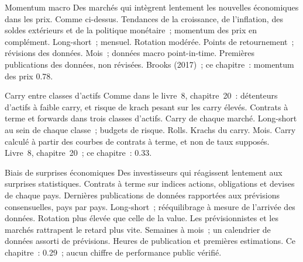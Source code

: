 \begin{strategyfile}{Momentum macro}\label{strat:s2:systematic-macro:momentum}
 Des marchés qui intègrent lentement les nouvelles économiques dans les prix.
 Comme ci-dessus.
 Tendances de la croissance, de l'inflation, des soldes extérieurs et de la politique monétaire~; momentum des prix en complément.
 Long-short~; mensuel.
 Rotation modérée.
 Points de retournement~; révisions des données.
 Mois~; données macro point-in-time.
 Premières publications des données, non révisées.
 Brooks (2017)~; ce chapitre~: momentum des prix 0.78.
\end{strategyfile}

\begin{strategyfile}{Carry entre classes d'actifs}\label{strat:s2:systematic-macro:carry}
 Comme dans le livre~8, chapitre~20~: détenteurs d'actifs à faible carry, et risque de krach pesant sur les carry élevés.
 Contrats à terme et forwards dans trois classes d'actifs.
 Carry de chaque marché.
 Long-short au sein de chaque classe~; budgets de risque.
 Rolls.
 Krachs du carry.
 Mois.
 Carry calculé à partir des courbes de contrats à terme, et non de taux supposés.
 Livre~8, chapitre~20~; ce chapitre~: 0.33.
\end{strategyfile}

\begin{strategyfile}{Biais de surprises économiques}\label{strat:s2:systematic-macro:surprise}
 Des investisseurs qui réagissent lentement aux surprises statistiques.
 Contrats à terme sur indices actions, obligations et devises de chaque pays.
 Dernières publications de données rapportées aux prévisions consensuelles, pays par pays.
 Long-short~; rééquilibrage à mesure de l'arrivée des données.
 Rotation plus élevée que celle de la value.
 Les prévisionnistes et les marchés rattrapent le retard plus vite.
 Semaines à mois~; un calendrier de données assorti de prévisions.
 Heures de publication et premières estimations.
 Ce chapitre~: 0.29~; aucun chiffre de performance public vérifié.
\end{strategyfile}

